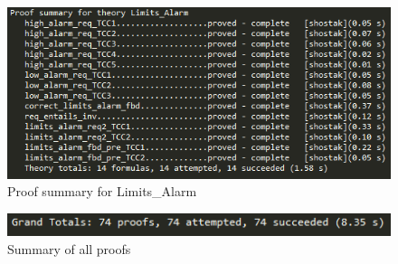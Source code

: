 \documentclass[fontsize=12pt,paper=letter,twoside]{scrartcl}
\begin{document}
\begin{figure}[!htb]
\begin{center}
\includegraphics[width=.8\textwidth]{pics/prf_Limits_Alarm.png}
\end{center}
\caption{Proof summary for Limits\_Alarm}
\label{fig:LimitsAlarm}
\end{figure}

\begin{figure}[!htb]
\begin{center}
\includegraphics[width=.8\textwidth]{pics/prf_all.png}
\end{center}
\caption{Summary of all proofs}
\label{fig:prfall}
\end{figure}

\FloatBarrier
\end{document}
